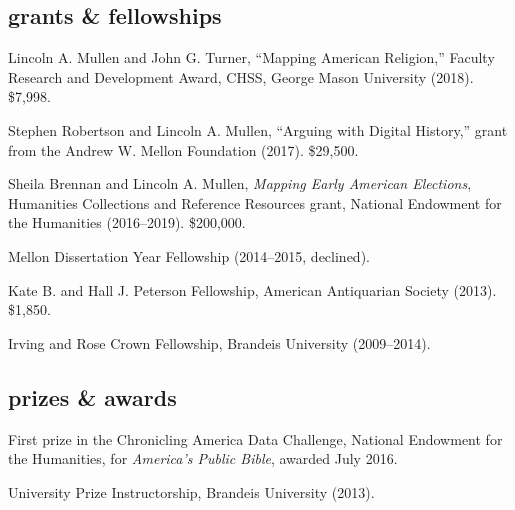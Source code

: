\documentclass[11pt]{article}
\begin{document}

% 

\subsection{grants \& fellowships}\label{grants-and-fellowships}

Lincoln A. Mullen and John G. Turner, ``Mapping American Religion,'' Faculty 
Research and Development Award, CHSS, George Mason University (2018). \$7,998.

Stephen Robertson and Lincoln A. Mullen, ``Arguing with Digital History,'' grant 
from the Andrew W. Mellon Foundation (2017). \$29,500.

Sheila Brennan and Lincoln A. Mullen, \emph{Mapping Early American Elections}, 
Humanities Collections and Reference Resources grant, National Endowment for 
the Humanities (2016--2019). \$200,000.

Mellon Dissertation Year Fellowship (2014--2015, declined).

Kate B. and Hall J. Peterson Fellowship, American Antiquarian Society (2013). \$1,850.

Irving and Rose Crown Fellowship, Brandeis University (2009--2014).

\subsection{prizes \& awards}\label{prizes-and-awards}

First prize in the Chronicling America Data Challenge, National Endowment 
for the Humanities, for \emph{America's Public Bible}, awarded July 2016.

University Prize Instructorship, Brandeis University (2013).
\end{document}

